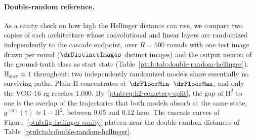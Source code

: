 \paragraph{Double-random reference.}\label{ptnb:sec:lmp-rand-double-random}
As a sanity check on how high the Hellinger distance can rise, we compare two copies of each architecture whose convolutional and linear layers are randomized independently to the cascade endpoint, over $R=500$ rounds with one test image drawn per round ($\drDistinctImages$ distinct images) and the output neuron of the ground-truth class as start state (Table~\ref{ptnb:tab:double-random-hellinger}). $\mathrm H_{\mathrm{surv}}\approx1$ throughout: two independently randomized models share essentially no surviving paths. Plain $\mathrm H$ concentrates at $\drFloorMin$--$\drFloorMax$, and only the VGG-16 \ac{rg} reaches $1.000$. By~\eqref{ptnb:eq:h2-cemetery-split}, the gap of $\mathrm H^2$ to one is the overlap of the trajectories that both models absorb at the same state, $g^{(0)}(\dagger)\approx1-\mathrm H^2$, between $0.05$ and $0.12$ here. The cascade curves of Figure~\ref{ptnb:fig:hellinger-sanity} plateau near the double-random distances of Table~\ref{ptnb:tab:double-random-hellinger}.

\begin{table}[htbp]
\TableContent{
    \centering
    \small
    
    }%
\caption[Hellinger trajectory distance at the double-random baseline]{Double-random Hellinger distances, mean $\pm$ standard deviation over $R=500$ rounds. Each round pairs two independently randomized copies of the architecture on one sampled ImageNet-S test image.}
    \label{ptnb:tab:double-random-hellinger}
\end{table}


\par\medskip
\providecommand{\nValGrid}{\textcolor{red}{??}}%


